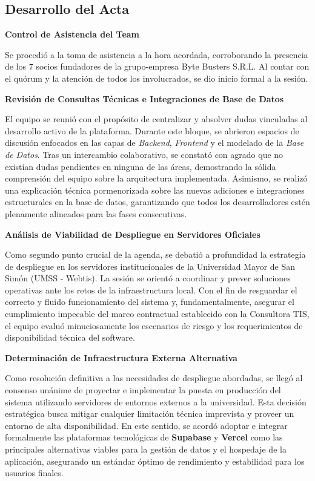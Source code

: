 \newpage
\subsection{Desarrollo del Acta}

\noindent \textbf{Control de Asistencia del Team}\par
Se procedió a la toma de asistencia a la hora acordada, corroborando la presencia de los 7 socios fundadores de la grupo-empresa Byte Busters S.R.L. Al contar con el quórum y la atención de todos los involucrados, se dio inicio formal a la sesión.

\vspace*{0.5cm}
\noindent \textbf{Revisión de Consultas Técnicas e Integraciones de Base de Datos}\par
El equipo se reunió con el propósito de centralizar y absolver dudas vinculadas al desarrollo activo de la plataforma. Durante este bloque, se abrieron espacios de discusión enfocados en las capas de \textit{Backend}, \textit{Frontend} y el modelado de la \textit{Base de Datos}. Tras un intercambio colaborativo, se constató con agrado que no existían dudas pendientes en ninguna de las áreas, demostrando la sólida comprensión del equipo sobre la arquitectura implementada. Asimismo, se realizó una explicación técnica pormenorizada sobre las nuevas adiciones e integraciones estructurales en la base de datos, garantizando que todos los desarrolladores estén plenamente alineados para las fases consecutivas.

\vspace*{0.5cm}
\noindent \textbf{Análisis de Viabilidad de Despliegue en Servidores Oficiales}\par
Como segundo punto crucial de la agenda, se debatió a profundidad la estrategia de despliegue en los servidores institucionales de la Universidad Mayor de San Simón (UMSS - Webtis). La sesión se orientó a coordinar y prever soluciones operativas ante los retos de la infraestructura local. Con el fin de resguardar el correcto y fluido funcionamiento del sistema y, fundamentalmente, asegurar el cumplimiento impecable del marco contractual establecido con la Consultora TIS, el equipo evaluó minuciosamente los escenarios de riesgo y los requerimientos de disponibilidad técnica del software.

\vspace*{0.5cm}
\noindent \textbf{Determinación de Infraestructura Externa Alternativa}\par
Como resolución definitiva a las necesidades de despliegue abordadas, se llegó al consenso unánime de proyectar e implementar la puesta en producción del sistema utilizando servidores de entornos externos a la universidad. Esta decisión estratégica busca mitigar cualquier limitación técnica imprevista y proveer un entorno de alta disponibilidad. En este sentido, se acordó adoptar e integrar formalmente las plataformas tecnológicas de \textbf{Supabase} y \textbf{Vercel} como las principales alternativas viables para la gestión de datos y el hospedaje de la aplicación, asegurando un estándar óptimo de rendimiento y estabilidad para los usuarios finales.

